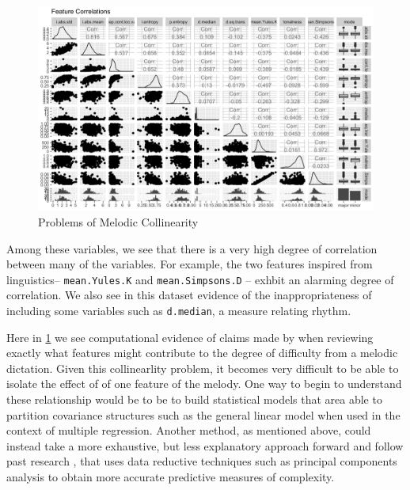 \documentclass[]{book}
\begin{document}
\begin{figure}

{\centering \includegraphics[width=1\linewidth]{img/FANTASTIC_collin} 

}

\caption{Problems of Melodic Collinearity}\label{fig:featurecorrelations}
\end{figure}

Among these variables, we see that there is a very high degree of correlation between many of the variables.
For example, the two features inspired from linguistics-- \texttt{mean.Yules.K} and \texttt{mean.Simpsons.D} -- exhbit an alarming degree of correlation.
We also see in this dataset evidence of the inappropriateness of including some variables such as \texttt{d.median}, a measure relating rhythm.

Here in \ref{fig:featurecorrelations} we see computational evidence of claims made by \citet{taylorStrategiesMemoryShort1983} when reviewing exactly what features might contribute to the degree of difficulty from a melodic dictation.
Given this collinearlity problem, it becomes very difficult to be able to isolate the effect of of one feature of the melody.
One way to begin to understand these relationship would be to be to build statistical models that area able to partition covariance structures such as the general linear model when used in the context of multiple regression.
Another method, as mentioned above, could instead take a more exhaustive, but less explanatory approach forward and follow past research \citep{bakerPerceptionLeitmotivesRichard2017, harrisonModellingMelodicDiscrimination2016}, that uses data reductive techniques such as principal components analysis to obtain more accurate predictive measures of complexity.
\end{document}
